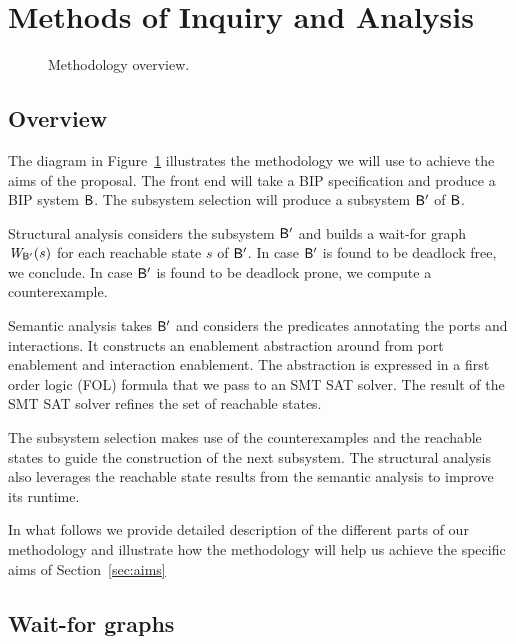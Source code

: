 \section{Methods of Inquiry and Analysis}

\begin{figure}[t]
  \begin{center}

    \resizebox{\textwidth}{!}{
     
   }
    \caption{Methodology overview.}
    \label{fig:overview}
  \end{center}
\end{figure}

\subsection{Overview} 

The diagram in Figure~\ref{fig:overview} illustrates the 
methodology we will use to achieve the aims of the proposal. 
The front end will take a BIP specification and produce
a BIP system $\mathsf{B}$. 
The subsystem selection will produce a subsystem $\mathsf{B}'$ of $\mathsf{B}$. 

Structural analysis considers the subsystem $\mathsf{B}'$ and builds
a wait-for graph $\mathit{W}_{\mathsf{B}'}(s)$ for each reachable state $s$ of $\mathsf{B}'$. 
In case $\mathsf{B}'$ is found to be deadlock free, we conclude. 
In case $\mathsf{B}'$ is found to be deadlock prone, we compute 
a counterexample. 

Semantic analysis takes $\mathsf{B}'$ and considers the predicates
annotating the ports and interactions. 
It constructs an enablement abstraction around from 
port enablement and interaction enablement. 
The abstraction is expressed in a first order logic (FOL)
formula that we pass to an SMT SAT solver. 
The result of the SMT SAT solver refines the set of reachable 
states. 

The subsystem selection makes use of the counterexamples 
and the reachable states to
guide the construction of the next subsystem. 
The structural analysis also leverages the reachable state
results from the semantic analysis to improve its runtime. 

In what follows we provide detailed description of the 
different parts of our methodology and illustrate how 
the methodology will help us achieve the specific aims
of Section~\ref{sec:aims}



\subsection{Wait-for graphs}


